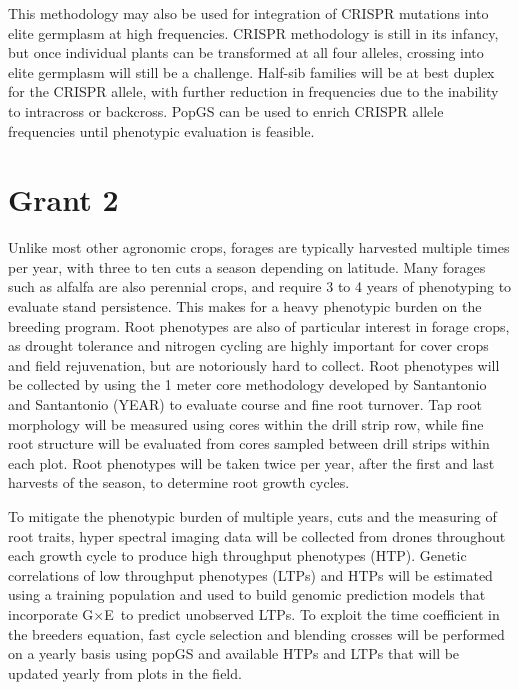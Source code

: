\documentclass[10pt]{article}
\newcommand{\gxe}{G$\times$E}
\begin{document}
This methodology may also be used for integration of CRISPR mutations into elite germplasm at high frequencies. CRISPR methodology is still in its infancy, but once individual plants can be transformed at all four alleles, crossing into elite germplasm will still be a challenge. Half-sib families will be at best duplex for the CRISPR allele, with further reduction in frequencies due to the inability to intracross or backcross. PopGS can be used to enrich CRISPR allele frequencies until phenotypic evaluation is feasible.

\section*{Grant 2}

Unlike most other agronomic crops, forages are typically harvested multiple times per year, with three to ten cuts a season depending on latitude. Many forages such as alfalfa are also perennial crops, and require 3 to 4 years of phenotyping to evaluate stand persistence. This makes for a heavy phenotypic burden on the breeding program. Root phenotypes are also of particular interest in forage crops, as drought tolerance and nitrogen cycling are highly important for cover crops and field rejuvenation, but are notoriously hard to collect. Root phenotypes will be collected by using the 1 meter core methodology developed by Santantonio and Santantonio (YEAR) to evaluate course and fine root turnover. Tap root morphology will be measured using cores within the drill strip row, while fine root structure will be evaluated from cores sampled between drill strips within each plot. Root phenotypes will be taken twice per year, after the first and last harvests of the season, to determine root growth cycles. 

To mitigate the phenotypic burden of multiple years, cuts and the measuring of root traits, hyper spectral imaging data will be collected from drones throughout each growth cycle to produce high throughput phenotypes (HTP). Genetic correlations of low throughput phenotypes (LTPs) and HTPs will be estimated using a training population and used to build genomic prediction models that incorporate \gxe\ to predict unobserved LTPs. To exploit the time coefficient in the breeders equation, fast cycle selection and blending crosses will be performed on a yearly basis using popGS and available HTPs and LTPs that will be updated yearly from plots in the field. 
\end{document}
